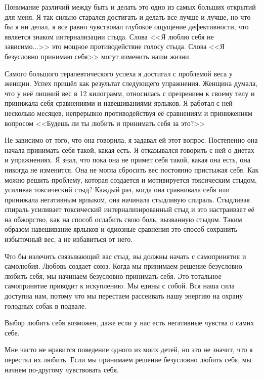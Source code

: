 \documentclass[10pt, fleqn]{article}
\begin{document}
Понимание различий между быть и делать это одно из самых больших открытий для меня. Я так сильно старался достигать и делать все лучше и лучше, но что бы я ни делал, я все равно чувствовал глубокое ощущение дефективности, что является знаком интернализации стыда. Слова <<Я люблю себя не зависимо...>> это мощное противодействие голосу стыда. Слова <<Я безусловно принимаю себя>> могут изменить наши жизни.

Самого большого терапевтического успеха я достигал с проблемой веса у женщин. Успех пришёл как результат следующего упражнения. Женщина думала, что у неё лишний вес в 12 килограмм, относилась с презрением к своему телу и принижала себя сравнениями и навешиваниями ярлыков. Я работал с ней несколько месяцев, непрерывно противодействуя её сравнениям и принижениям вопросом <<Будешь ли ты любить и принимать себя за это?>>

Не зависимо от того, что она говорила, я задавал ей этот вопрос. Постепенно она начала принимать себя такой, какая есть. Я отказывался говорить с ней о диетах и упражнениях. Я знал, что пока она не примет себя такой, какая она есть, она никогда не изменится. Она не могла сбросить вес постоянно пристыжая себя. Как можно решить проблему, которая создается и мотивируется токсическим стыдом, усиливая токсический стыд? Каждый раз, когда она сравнивала себя или принижала негативным ярлыком, она начинала стыдливую спираль. Стыдливая спираль усиливает токсический интернализированный стыд и это настраивает её на обжорство, как на способ ослабить свою боль, вызванную стыдом. Таким образом навешивание ярлыков и одиозные сравнения это способ сохранить избыточный вес, а не избавиться от него.

Что бы излечить связывающий вас стыд, вы должны начать с самопринятия и самолюбия. Любовь создает союз. Когда мы принимаем решение безусловно любить себя, мы начинаем безусловно принимать себя. Это тотальное самопринятие приводит к искуплению. Мы едины с собой. Вся наша сила доступна нам, потому что мы перестаем рассеивать нашу энергию на охрану голодных собак в подвале.

Выбор любить себя возможен, даже если у нас есть негативные чувства о самих себе.

Мне часто не нравится поведение одного из моих детей, но это не значит, что я перестал их любить. Если мы принимаем решение безусловно любить себя, мы начнем по-другому чувствовать себя.
\end{document}
